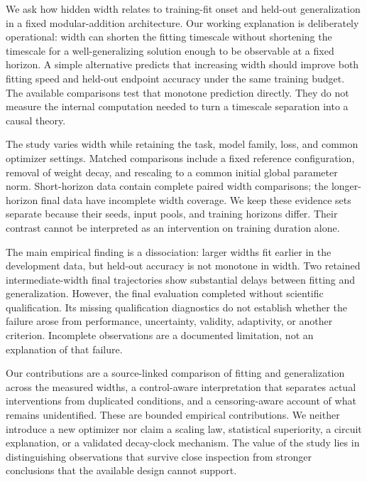 \documentclass{article}
\begin{document}
We ask how hidden width relates to training-fit onset and held-out generalization in a fixed modular-addition architecture. Our working explanation is deliberately operational: width can shorten the fitting timescale without shortening the timescale for a well-generalizing solution enough to be observable at a fixed horizon. A simple alternative predicts that increasing width should improve both fitting speed and held-out endpoint accuracy under the same training budget. The available comparisons test that monotone prediction directly. They do not measure the internal computation needed to turn a timescale separation into a causal theory.

The study varies width while retaining the task, model family, loss, and common optimizer settings. Matched comparisons include a fixed reference configuration, removal of weight decay, and rescaling to a common initial global parameter norm. Short-horizon data contain complete paired width comparisons; the longer-horizon final data have incomplete width coverage. We keep these evidence sets separate because their seeds, input pools, and training horizons differ. Their contrast cannot be interpreted as an intervention on training duration alone.

The main empirical finding is a dissociation: larger widths fit earlier in the development data, but held-out accuracy is not monotone in width. Two retained intermediate-width final trajectories show substantial delays between fitting and generalization. However, the final evaluation completed without scientific qualification. Its missing qualification diagnostics do not establish whether the failure arose from performance, uncertainty, validity, adaptivity, or another criterion. Incomplete observations are a documented limitation, not an explanation of that failure.

Our contributions are a source-linked comparison of fitting and generalization across the measured widths, a control-aware interpretation that separates actual interventions from duplicated conditions, and a censoring-aware account of what remains unidentified. These are bounded empirical contributions. We neither introduce a new optimizer nor claim a scaling law, statistical superiority, a circuit explanation, or a validated decay-clock mechanism. The value of the study lies in distinguishing observations that survive close inspection from stronger conclusions that the available design cannot support.
\end{document}
